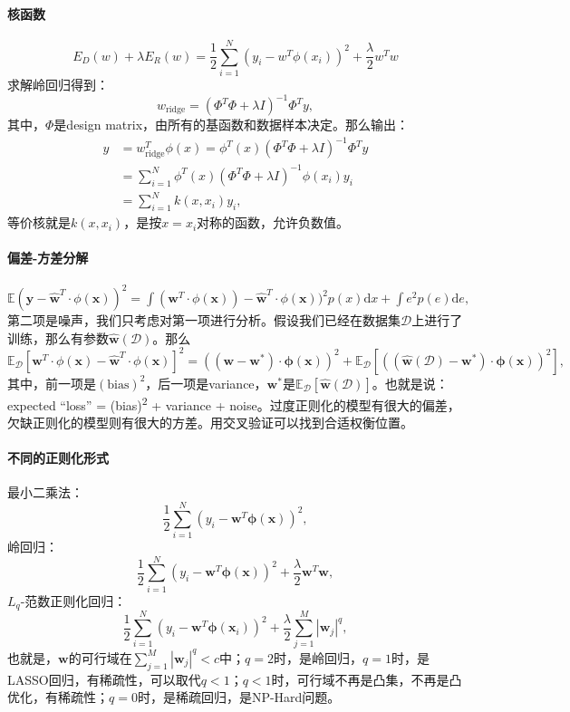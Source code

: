 \paragraph{核函数}
$$E_D(w)+\lambda E_R(w)=\frac{1}{2}\sum_{i=1}^{N}(y_i-w^T\phi(x_i))^2 + \frac{\lambda}{2}w^Tw$$
求解岭回归得到：
$$w_\mathrm{ridge} = (\Phi^T\Phi + \lambda I)^{-1}\Phi^T y,$$
其中，$\Phi$是design matrix，由所有的基函数和数据样本决定。那么输出：
$$
\begin{aligned}
    \hat{y} &= w_\mathrm{ridge}^T\phi(x) = \phi^T(x)(\Phi^T\Phi + \lambda I)^{-1}\Phi^T y \\
    &= \sum_{i=1}^N \phi^T(x)(\Phi^T\Phi + \lambda I)^{-1}\phi(x_i) y_i\\
    &= \sum_{i=1}^N k(x, x_i)y_i,
\end{aligned}
$$
等价核就是$k(x, x_i)$，是按$x = x_i$对称的函数，允许负数值。

\paragraph{偏差-方差分解}
$\mathbb{E}(\bm y - \hat{\bm w}^T\cdot \phi(\bm x))^2 = \int ({\bm w}^T\cdot \phi(\bm x)) - \hat{\bm w}^T\cdot \phi(\bm x))^2p(x)\mathrm{d}x + \int e^2p(e)\mathrm{d}e,$
第二项是噪声，我们只考虑对第一项进行分析。假设我们已经在数据集$\mathcal{D}$上进行了训练，那么有参数$\hat{\bm w}(\mathcal{D})$。那么$\mathbb{E}_\mathcal{D}[{\bm w}^T\cdot \phi(\bm x) - \hat{\bm w}^T\cdot \phi(\bm x)]^2 = (({\bm w} - {\bm w}^*)\cdot \bm\phi(\bm x))^2 + \mathbb{E}_\mathcal{D}[((\hat{\bm w}(\mathcal{D}) - {\bm w}^*)\cdot \bm\phi(\bm x))^2],$其中，前一项是$(\text{bias})^2$，后一项是variance，${\bm w}^*$是$\mathbb{E}_\mathcal{D}[\hat{\bm w}(\mathcal{D})]$。也就是说：expected ``loss'' = (bias)\textsuperscript{2} + variance + noise。过度正则化的模型有很大的偏差，欠缺正则化的模型则有很大的方差。用交叉验证可以找到合适权衡位置。

\paragraph{不同的正则化形式} 最小二乘法：$$\frac{1}{2}\sum^N_{i=1}(y_i - \bm w^T\bm\phi(\bm x))^2,$$
岭回归：$$
\frac{1}{2}\sum^N_{i=1}(y_i - \bm w^T\bm\phi(\bm x))^2 + \frac{\lambda}{2}\bm w^T\bm w,$$
$L_q$-范数正则化回归：$$
\frac{1}{2}\sum^N_{i=1}(y_i - \bm w^T\bm\phi(\bm x_i))^2 + \frac{\lambda}{2}\sum_{j=1}^M |\bm w_j|^q,$$也就是，$\bm w$的可行域在$\sum_{j=1}^M |\bm w_j|^q < c$中；$q=2$时，是岭回归，$q=1$时，是LASSO回归，有稀疏性，可以取代$q<1$；$q<1$时，可行域不再是凸集，不再是凸优化，有稀疏性；$q=0$时，是稀疏回归，是NP-Hard问题。

